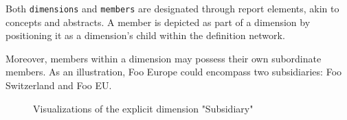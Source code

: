 Both \texttt{dimensions} and \texttt{members} are designated through report elements, akin to concepts and abstracts.
A member is depicted as part of a dimension by positioning it as a dimension's child within the definition network.

Moreover, members within a dimension may possess their own subordinate members.
As an illustration, Foo Europe could encompass two subsidiaries: Foo Switzerland and Foo EU.

\begin{figure}[H]
    \label{fig:example_explicit_dimension}
    \caption{Visualizations of the explicit dimension "Subsidiary"}
\end{figure}







